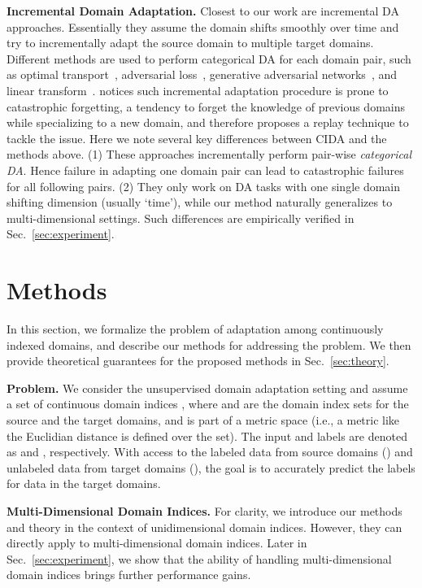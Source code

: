 \documentclass{article}
\newcommand{\secref}[1]{Sec.~\ref{#1}}
\begin{document}
\textbf{Incremental Domain Adaptation.} Closest to our work are incremental DA approaches. Essentially they assume the domain shifts smoothly over time and try to incrementally adapt the source domain to multiple target domains. Different methods are used to perform categorical DA for each domain pair, such as optimal transport~\cite{CDOT}, adversarial loss~\cite{bitarafan2016incremental}, generative adversarial networks~\cite{wulfmeier2018incremental}, and linear transform~\cite{hoffman2014continuous}.   notices such incremental adaptation procedure is prone to catastrophic forgetting, a tendency to forget the knowledge of previous domains while specializing to a new domain, and therefore proposes a replay technique to tackle the issue. Here we note several key differences between CIDA and the methods above. (1) These approaches incrementally perform pair-wise \emph{categorical DA}. Hence failure in adapting one domain pair can lead to catastrophic failures for all following pairs. (2) They only work on DA tasks with one single domain shifting dimension (usually `time'), while our method naturally generalizes to multi-dimensional settings. Such differences are empirically verified in \secref{sec:experiment}. 


 \section{Methods}
\label{sec:method}
In this section, we formalize the problem of adaptation among continuously indexed domains, and describe our methods for addressing the problem. We then provide theoretical guarantees for the proposed methods in \secref{sec:theory}.


\textbf{Problem.} We consider the unsupervised domain adaptation setting and assume a set of continuous domain indices , where  and  are the domain index sets for the source and the target domains, and  is part of a metric space (i.e., a metric like the Euclidian distance is defined over the set). The input and labels are denoted as  and , respectively. With access to the labeled data  from source domains () and unlabeled data  from target domains (), the goal is to accurately predict the labels  for data in the target domains. 

\textbf{Multi-Dimensional Domain Indices.} 
For clarity, we introduce our methods and theory in the context of unidimensional domain indices. However, they can directly apply to multi-dimensional domain indices. Later in \secref{sec:experiment}, we show that the ability of handling multi-dimensional domain indices brings further performance gains.
\end{document}
